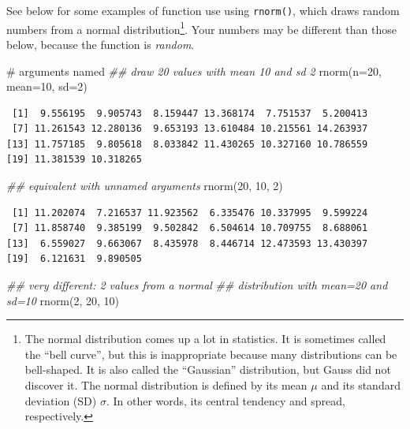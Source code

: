 \documentclass[
  13,
  letterpaper,
]{report}
\newenvironment{Shaded}{\begin{snugshade}}{\end{snugshade}}
\newcommand{\AttributeTok}[1]{\textcolor[rgb]{0.40,0.45,0.13}{#1}}
\newcommand{\CommentTok}[1]{\textcolor[rgb]{0.37,0.37,0.37}{#1}}
\newcommand{\DecValTok}[1]{\textcolor[rgb]{0.68,0.00,0.00}{#1}}
\newcommand{\DocumentationTok}[1]{\textcolor[rgb]{0.37,0.37,0.37}{\textit{#1}}}
\newcommand{\FunctionTok}[1]{\textcolor[rgb]{0.28,0.35,0.67}{#1}}
\newcommand{\NormalTok}[1]{\textcolor[rgb]{0.00,0.23,0.31}{#1}}
\begin{document}
See below for some examples of function use using \texttt{rnorm()},
which draws random numbers from a normal distribution\footnote{The
  normal distribution comes up a lot in statistics. It is sometimes
  called the ``bell curve'', but this is inappropriate because many
  distributions can be bell-shaped. It is also called the ``Gaussian''
  distribution, but Gauss did not discover it. The normal distribution
  is defined by its mean \(\mu\) and its standard deviation (SD)
  \(\sigma\). In other words, its central tendency and spread,
  respectively.}. Your numbers may be different than those below,
because the function is \emph{random}.

\begin{Shaded}
\begin{Highlighting}[]
\CommentTok{\# arguments named}
\DocumentationTok{\#\# draw 20 values with mean 10 and sd 2}
\FunctionTok{rnorm}\NormalTok{(}\AttributeTok{n=}\DecValTok{20}\NormalTok{, }\AttributeTok{mean=}\DecValTok{10}\NormalTok{, }\AttributeTok{sd=}\DecValTok{2}\NormalTok{)}
\end{Highlighting}
\end{Shaded}

\begin{verbatim}
 [1]  9.556195  9.905743  8.159447 13.368174  7.751537  5.200413
 [7] 11.261543 12.280136  9.653193 13.610484 10.215561 14.263937
[13] 11.757185  9.805618  8.033842 11.430265 10.327160 10.786559
[19] 11.381539 10.318265
\end{verbatim}

\begin{Shaded}
\begin{Highlighting}[]
\DocumentationTok{\#\# equivalent with unnamed arguments}
\FunctionTok{rnorm}\NormalTok{(}\DecValTok{20}\NormalTok{, }\DecValTok{10}\NormalTok{, }\DecValTok{2}\NormalTok{)}
\end{Highlighting}
\end{Shaded}

\begin{verbatim}
 [1] 11.202074  7.216537 11.923562  6.335476 10.337995  9.599224
 [7] 11.858740  9.385199  9.502842  6.504614 10.709755  8.688061
[13]  6.559027  9.663067  8.435978  8.446714 12.473593 13.430397
[19]  6.121631  9.890505
\end{verbatim}

\begin{Shaded}
\begin{Highlighting}[]
\DocumentationTok{\#\# very different: 2 values from a normal}
\DocumentationTok{\#\# distribution with mean=20 and sd=10}
\FunctionTok{rnorm}\NormalTok{(}\DecValTok{2}\NormalTok{, }\DecValTok{20}\NormalTok{, }\DecValTok{10}\NormalTok{)}
\end{Highlighting}
\end{Shaded}
\end{document}
